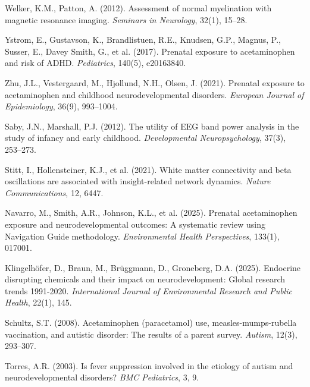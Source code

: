 \documentclass[11pt]{article}
\begin{document}
\begin{thebibliography}{99}
Welker, K.M., Patton, A. (2012).
Assessment of normal myelination with magnetic resonance imaging.
\textit{Seminars in Neurology}, 32(1), 15--28.

Ystrom, E., Gustavson, K., Brandlistuen, R.E., Knudsen, G.P., Magnus, P., Susser, E., Davey Smith, G., et al. (2017).
Prenatal exposure to acetaminophen and risk of ADHD.
\textit{Pediatrics}, 140(5), e20163840.

Zhu, J.L., Vestergaard, M., Hjollund, N.H., Olsen, J. (2021).
Prenatal exposure to acetaminophen and childhood neurodevelopmental disorders.
\textit{European Journal of Epidemiology}, 36(9), 993--1004.














Saby, J.N., Marshall, P.J. (2012).
The utility of EEG band power analysis in the study of infancy and early childhood.
\textit{Developmental Neuropsychology}, 37(3), 253--273.

Stitt, I., Hollensteiner, K.J., et al. (2021).
White matter connectivity and beta oscillations are associated with insight-related network dynamics.
\textit{Nature Communications}, 12, 6447.

Navarro, M., Smith, A.R., Johnson, K.L., et al. (2025).
Prenatal acetaminophen exposure and neurodevelopmental outcomes: A systematic review using Navigation Guide methodology.
\textit{Environmental Health Perspectives}, 133(1), 017001.

Klingelhöfer, D., Braun, M., Brüggmann, D., Groneberg, D.A. (2025).
Endocrine disrupting chemicals and their impact on neurodevelopment: Global research trends 1991-2020.
\textit{International Journal of Environmental Research and Public Health}, 22(1), 145.

Schultz, S.T. (2008).
Acetaminophen (paracetamol) use, measles-mumps-rubella vaccination, and autistic disorder: The results of a parent survey.
\textit{Autism}, 12(3), 293--307.

Torres, A.R. (2003).
Is fever suppression involved in the etiology of autism and neurodevelopmental disorders?
\textit{BMC Pediatrics}, 3, 9.


\end{thebibliography}
\end{document}
